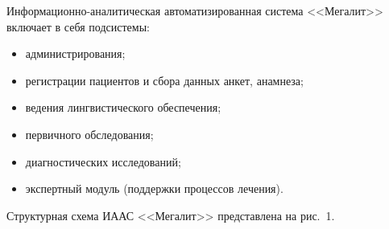 \begin{multicols}{2}
      Информационно-аналитическая автоматизированная система
       <<Мегалит>> включает в себя подсистемы:
      \begin{itemize}
\item администрирования;
\item регистрации пациентов и сбора данных анкет, анамнеза;
\item ведения лингвистического обеспечения;
\item первичного обследования;
\item диагностических исследований;
\item экспертный модуль (поддержки процессов лечения).
\end{itemize}

Структурная схема ИААС <<Мегалит>> пред\-став\-ле\-на на рис.~1.


\begin{figure*}[b] %
   \vspace*{1pt}
 \begin{center}
 \mbox{%
 \epsfxsize=161.589mm
 }
 \end{center}
 \vspace*{-6pt}
\end{figure*}



\end{multicols}

